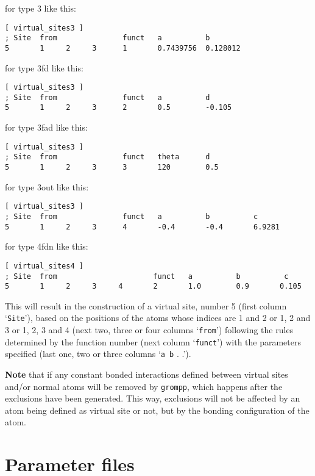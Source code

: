 for type 3 like this:
{\small
\begin{verbatim}
[ virtual_sites3 ]
; Site  from               funct   a          b
5       1     2     3      1       0.7439756  0.128012
\end{verbatim}}

for type 3fd like this:
{\small
\begin{verbatim}
[ virtual_sites3 ]
; Site  from               funct   a          d
5       1     2     3      2       0.5        -0.105
\end{verbatim}}

for type 3fad like this:
{\small
\begin{verbatim}
[ virtual_sites3 ]
; Site  from               funct   theta      d
5       1     2     3      3       120        0.5
\end{verbatim}}

for type 3out like this:
{\small
\begin{verbatim}
[ virtual_sites3 ]
; Site  from               funct   a          b          c
5       1     2     3      4       -0.4       -0.4       6.9281
\end{verbatim}}

for type 4fdn like this:
{\small
\begin{verbatim}
[ virtual_sites4 ]
; Site  from                      funct   a          b          c
5       1     2     3     4       2       1.0        0.9       0.105
\end{verbatim}}

This will result in the construction of a virtual site, number 5
(first column `{\tt Site}'), based on the positions of the atoms
whose indices are 1 and 2 or 1, 2 and 3 or 1, 2, 3 and 4 (next two,
three or four columns `{\tt from}') following the rules determined by the function number
(next column `{\tt funct}') with the parameters specified (last one,
two or three columns `{\tt a b} . .').

{\bf Note} that if any constant bonded interactions defined between
virtual sites and/or normal atoms will be removed by {\tt grompp},
which happens after the exclusions have been generated.
This way, exclusions will not be affected by an atom being
defined as virtual site or not, but by the bonding configuration of the
atom.

\section{Parameter files}
\label{sec:paramfiles}
